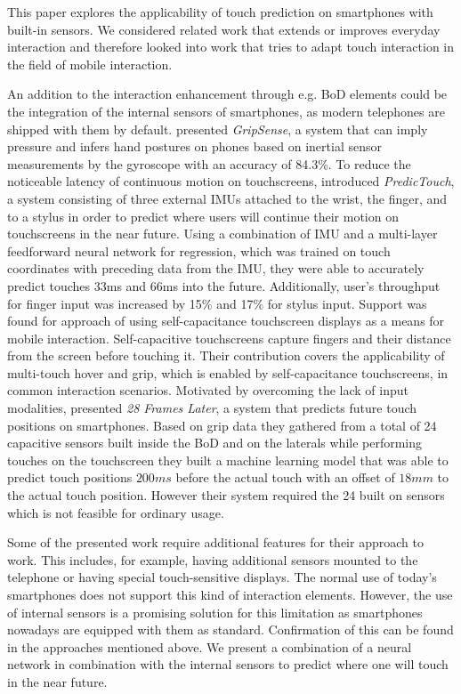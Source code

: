 This paper explores the applicability of touch prediction on smartphones with built-in sensors. 
We considered related work that extends or improves everyday interaction and therefore looked into work that tries to adapt touch interaction in the field of mobile interaction.

An addition to the interaction enhancement through e.g. BoD elements could be the integration of the internal sensors of smartphones, as modern telephones are shipped with them by default.
\citeauthor{Goel2012a} \cite{Goel2012a} presented \textit{GripSense}, a system that can imply pressure and infers hand postures on phones based on inertial sensor measurements by the gyroscope with an accuracy of 84.3\%.
To reduce the noticeable latency of continuous motion on touchscreens, \citeauthor{Le2017:Predic} \cite{Le2017:Predic} introduced \textit{PredicTouch}, a system consisting of three external IMUs attached to the wrist, the finger, and to a stylus in order to predict where users will continue their motion on touchscreens in the near future.
Using a combination of IMU and a multi-layer feedforward neural network for regression, which was trained on touch coordinates with preceding data from the IMU, they were able to accurately predict touches 33ms and 66ms into the future.
Additionally, user's throughput for finger input was increased by 15\% and 17\% for stylus input.
Support was found for \citeauthor{Hinckley2016} \cite{Hinckley2016} approach of using self-capacitance touchscreen displays as a means for mobile interaction.
Self-capacitive touchscreens capture fingers and their distance from the screen before touching it.  
Their contribution covers the applicability of multi-touch hover and grip, which is enabled by self-capacitance touchscreens, in common interaction scenarios.
Motivated by overcoming the lack of input modalities, \citeauthor{MohdNoor2016} \cite{MohdNoor2016} presented \textit{28 Frames Later}, a system that predicts future touch positions on smartphones.
Based on grip data they gathered from a total of 24 capacitive sensors built inside the BoD and on the laterals while performing touches on the touchscreen they built a machine learning model that was able to predict touch positions $ 200ms $ before the actual touch with an offset of $ 18mm $ to the actual touch position.
However their system required the 24 built on sensors which is not feasible for ordinary usage.

Some of the presented work require additional features for their approach to work.
This includes, for example, having additional sensors mounted to the telephone or having special touch-sensitive displays. 
The normal use of today's smartphones does not support this kind of interaction elements.
However, the use of internal sensors is a promising solution for this limitation as smartphones nowadays are equipped with them as standard.
Confirmation of this can be found in the approaches mentioned above.
We present a combination of a neural network in combination with the internal sensors to predict where one will touch in the near future. 
